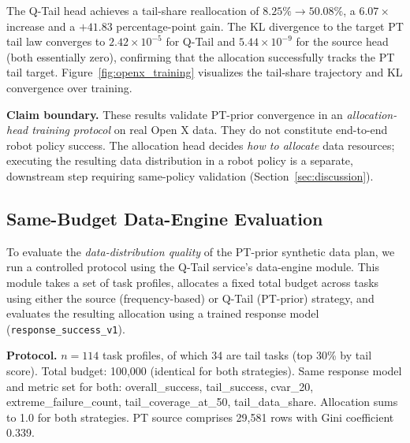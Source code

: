 \documentclass[10pt]{article}
\begin{document}
The Q-Tail head achieves a tail-share reallocation of $8.25\%\to 50.08\%$, a
$6.07\times$ increase and a $+41.83$ percentage-point gain.  The KL divergence to the
target PT tail law converges to $2.42\times10^{-5}$ for Q-Tail and $5.44\times10^{-9}$
for the source head (both essentially zero), confirming that the allocation successfully
tracks the PT tail target.  Figure~\ref{fig:openx_training} visualizes the tail-share
trajectory and KL convergence over training.

\medskip\noindent\textbf{Claim boundary.}  These results validate PT-prior convergence
in an \emph{allocation-head training protocol} on real Open X data.  They do not constitute
end-to-end robot policy success.  The allocation head decides \emph{how to allocate}
data resources; executing the resulting data distribution in a robot policy is a separate,
downstream step requiring same-policy validation (Section~\ref{sec:discussion}).

\subsection{Same-Budget Data-Engine Evaluation}
\label{sec:data_engine}

To evaluate the \emph{data-distribution quality} of the PT-prior synthetic data plan,
we run a controlled protocol using the Q-Tail service's data-engine module.  This module
takes a set of task profiles, allocates a fixed total budget across tasks using either
the source (frequency-based) or Q-Tail (PT-prior) strategy, and evaluates the resulting
allocation using a trained response model (\texttt{response\_success\_v1}).

\medskip\noindent\textbf{Protocol.}
$n=114$ task profiles, of which 34 are tail tasks (top 30\% by tail score).
Total budget: 100,000 (identical for both strategies).
Same response model and metric set for both: overall\_success, tail\_success,
cvar\_20, extreme\_failure\_count, tail\_coverage\_at\_50, tail\_data\_share.
Allocation sums to 1.0 for both strategies.  PT source comprises 29,581 rows with Gini
coefficient 0.339.
\end{document}
